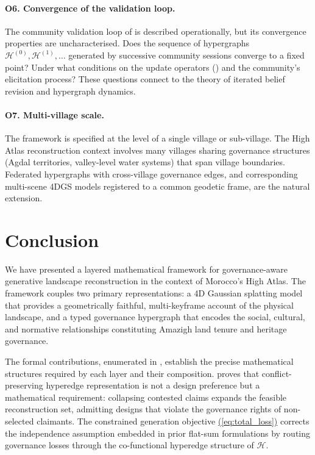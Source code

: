 \documentclass[11pt,a4paper]{article}
\renewcommand{\eqref}[1]{%
    \hyperref[#1]{\textcolor{eqred}{(\ref*{#1})}}%
}
\theoremstyle{plain}
\theoremstyle{definition}
\theoremstyle{remark}
\newcommand{\HG}{\mathcal{H}}
\begin{document}
\paragraph{O6. Convergence of the validation loop.}
The community validation loop of  is described
operationally, but its convergence properties are uncharacterised.
Does the sequence of hypergraphs $\HG^{(0)}, \HG^{(1)}, \ldots$
generated by successive community sessions converge to a fixed point?
Under what conditions on the update operators ()
and the community's elicitation process? These questions connect to
the theory of iterated belief revision and hypergraph dynamics.

\paragraph{O7. Multi-village scale.}
The framework is specified at the level of a single village or
sub-village. The High Atlas reconstruction context involves many
villages sharing governance structures (Agdal territories, valley-level
water systems) that span village boundaries. Federated hypergraphs
with cross-village governance edges, and corresponding multi-scene
4DGS models registered to a common geodetic frame, are the natural
extension.

\section{Conclusion}
\label{sec:conclusion}

We have presented a layered mathematical framework for governance-aware
generative landscape reconstruction in the context of Morocco's High
Atlas. The framework couples two primary representations: a 4D Gaussian
splatting model that provides a geometrically faithful, multi-keyframe
account of the physical landscape, and a typed governance hypergraph
that encodes the social, cultural, and normative relationships
constituting Amazigh land tenure and heritage governance.

The formal contributions, enumerated in ,
establish the precise mathematical structures required by each layer
and their composition.  proves that
conflict-preserving hyperedge representation is not a design preference
but a mathematical requirement: collapsing contested claims expands
the feasible reconstruction set, admitting designs that violate the
governance rights of non-selected claimants. The constrained generation
objective \eqref{eq:total_loss} corrects the independence assumption
embedded in prior flat-sum formulations by routing governance losses
through the co-functional hyperedge structure of $\HG$.
\end{document}
